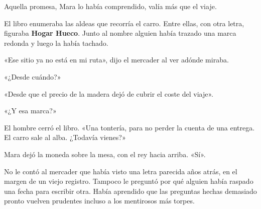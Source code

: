 \documentclass[10pt,a4paper]{article}
\begin{document}
Aquella promesa, Mara lo había comprendido, valía más que el viaje.

El libro enumeraba las aldeas que recorría el carro. Entre ellas, con otra letra, figuraba \textbf{Hogar Hueco}. Junto al nombre alguien había trazado una marca redonda y luego la había tachado.

«Ese sitio ya no está en mi ruta», dijo el mercader al ver adónde miraba.

«¿Desde cuándo?»

«Desde que el precio de la madera dejó de cubrir el coste del viaje».

«¿Y esa marca?»

El hombre cerró el libro. «Una tontería, para no perder la cuenta de una entrega. El carro sale al alba. ¿Todavía vienes?»

Mara dejó la moneda sobre la mesa, con el rey hacia arriba. «Sí».

No le contó al mercader que había visto una letra parecida años atrás, en el margen de un viejo registro. Tampoco le preguntó por qué alguien había raspado una fecha para escribir otra. Había aprendido que las preguntas hechas demasiado pronto vuelven prudentes incluso a los mentirosos más torpes.
\end{document}
